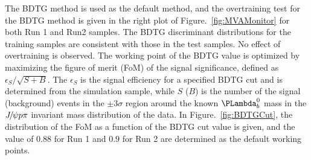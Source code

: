 The BDTG method is used as the default method, 
and the overtraining test for the BDTG method is given in the right plot of Figure.~\ref{fig:MVAMonitor} for both Run 1 and Run2 samples.
The BDTG discriminant distributions for the training samples are consistent with those in the test samples. 
No effect of overtraining is observed.
The working point of the BDTG value is optimized by maximizing the figure of merit (FoM) of the signal significance, 
defined as $\epsilon_S/\sqrt{S+B}$.
The $\epsilon_S$ is the signal efficiency for a specified BDTG cut and is determined from the simulation sample, 
while $S$ ($B$) is the number of the signal (background) events in the $\pm3\sigma$ region around the known $\Lb$ mass 
in the ${{J\mskip -3mu/\mskip -2mu\psi}}{p}\pi$ invariant mass distribution of the data.
In Figure.~\ref{fig:BDTGCut}, 
the distribution of the FoM as a function of the BDTG cut value is given, 
and the value of $0.88$ for Run 1 and $0.9$ for Run 2 are determined as the default working points.



